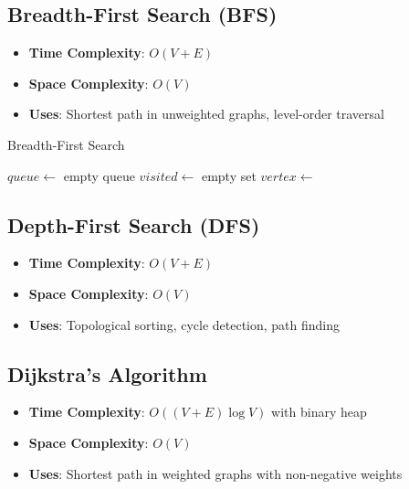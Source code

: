 \documentclass[11pt]{article}
\theoremstyle{definition}
\begin{document}
\subsection{Breadth-First Search (BFS)}
\begin{itemize}
    \item \textbf{Time Complexity}: $O(V + E)$
    \item \textbf{Space Complexity}: $O(V)$
    \item \textbf{Uses}: Shortest path in unweighted graphs, level-order traversal
\end{itemize}

\begin{algorithm}
\caption{Breadth-First Search}
\begin{algorithmic}[1]
    \State $queue \gets$ empty queue
    \State $visited \gets$ empty set
    \State {}
    \State {}
        \State $vertex \gets$ 
        \State {}
                \State {}
                \State {}
            \EndIf
        \EndFor
    \EndWhile
\EndProcedure
\end{algorithmic}
\end{algorithm}

\subsection{Depth-First Search (DFS)}
\begin{itemize}
    \item \textbf{Time Complexity}: $O(V + E)$
    \item \textbf{Space Complexity}: $O(V)$
    \item \textbf{Uses}: Topological sorting, cycle detection, path finding
\end{itemize}

\subsection{Dijkstra's Algorithm}
\begin{itemize}
    \item \textbf{Time Complexity}: $O((V + E) \log V)$ with binary heap
    \item \textbf{Space Complexity}: $O(V)$
    \item \textbf{Uses}: Shortest path in weighted graphs with non-negative weights
\end{itemize}
\end{document}
